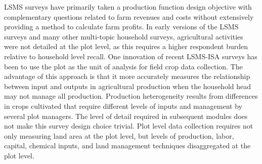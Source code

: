 \documentclass[
]{book}
\begin{document}
LSMS surveys have primarily taken a production function design objective with complementary questions related to farm revenues and costs without extensively providing a method to calculate farm profits. In early versions of the LSMS surveys and many other multi-topic household surveys, agricultural activities were not detailed at the plot level, as this requires a higher respondent burden relative to household level recall. One innovation of recent LSMS-ISA surveys has been to use the plot as the unit of analysis for field crop data collection. The advantage of this approach is that it more accurately measures the relationship between input and outputs in agricultural production when the household head may not manage all production. Production heterogeneity results from differences in crops cultivated that require different levels of inputs and management by several plot managers. The level of detail required in subsequent modules does not make this survey design choice trivial. Plot level data collection requires not only measuring land area at the plot level, but levels of production, labor, capital, chemical inputs, and land management techniques disaggregated at the plot level.
\end{document}
